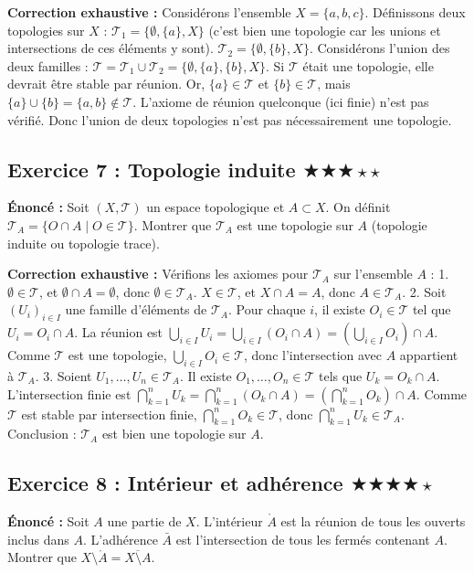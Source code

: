 \documentclass[11pt,a4paper]{article}
\begin{document}
\textbf{Correction exhaustive :}
Considérons l'ensemble $X = \{a, b, c\}$.
Définissons deux topologies sur $X$ :
$\mathcal{T}_1 = \{\emptyset, \{a\}, X\}$ (c'est bien une topologie car les unions et intersections de ces éléments y sont).
$\mathcal{T}_2 = \{\emptyset, \{b\}, X\}$.
Considérons l'union des deux familles : $\mathcal{T} = \mathcal{T}_1 \cup \mathcal{T}_2 = \{\emptyset, \{a\}, \{b\}, X\}$.
Si $\mathcal{T}$ était une topologie, elle devrait être stable par réunion.
Or, $\{a\} \in \mathcal{T}$ et $\{b\} \in \mathcal{T}$, mais $\{a\} \cup \{b\} = \{a, b\} \notin \mathcal{T}$.
L'axiome de réunion quelconque (ici finie) n'est pas vérifié. Donc l'union de deux topologies n'est pas nécessairement une topologie.
\subsection*{Exercice 7 : Topologie induite \quad $\bigstar\bigstar\bigstar\star\star$}
\textbf{Énoncé :}
Soit $(X, \mathcal{T})$ un espace topologique et $A \subset X$. On définit $\mathcal{T}_A = \{O \cap A \mid O \in \mathcal{T}\}$. Montrer que $\mathcal{T}_A$ est une topologie sur $A$ (topologie induite ou topologie trace).

\textbf{Correction exhaustive :}
Vérifions les axiomes pour $\mathcal{T}_A$ sur l'ensemble $A$ :
1. $\emptyset \in \mathcal{T}$, et $\emptyset \cap A = \emptyset$, donc $\emptyset \in \mathcal{T}_A$.
   $X \in \mathcal{T}$, et $X \cap A = A$, donc $A \in \mathcal{T}_A$.
2. Soit $(U_i)_{i \in I}$ une famille d'éléments de $\mathcal{T}_A$. Pour chaque $i$, il existe $O_i \in \mathcal{T}$ tel que $U_i = O_i \cap A$.
   La réunion est $\bigcup_{i \in I} U_i = \bigcup_{i \in I} (O_i \cap A) = \left( \bigcup_{i \in I} O_i \right) \cap A$.
   Comme $\mathcal{T}$ est une topologie, $\bigcup_{i \in I} O_i \in \mathcal{T}$, donc l'intersection avec $A$ appartient à $\mathcal{T}_A$.
3. Soient $U_1, \dots, U_n \in \mathcal{T}_A$. Il existe $O_1, \dots, O_n \in \mathcal{T}$ tels que $U_k = O_k \cap A$.
   L'intersection finie est $\bigcap_{k=1}^n U_k = \bigcap_{k=1}^n (O_k \cap A) = \left( \bigcap_{k=1}^n O_k \right) \cap A$.
   Comme $\mathcal{T}$ est stable par intersection finie, $\bigcap_{k=1}^n O_k \in \mathcal{T}$, donc $\bigcap_{k=1}^n U_k \in \mathcal{T}_A$.
Conclusion : $\mathcal{T}_A$ est bien une topologie sur $A$.
\subsection*{Exercice 8 : Intérieur et adhérence \quad $\bigstar\bigstar\bigstar\bigstar\star$}
\textbf{Énoncé :}
Soit $A$ une partie de $X$. L'intérieur $\mathring{A}$ est la réunion de tous les ouverts inclus dans $A$. L'adhérence $\bar{A}$ est l'intersection de tous les fermés contenant $A$. Montrer que $X \setminus \mathring{A} = \overline{X \setminus A}$.
\end{document}
